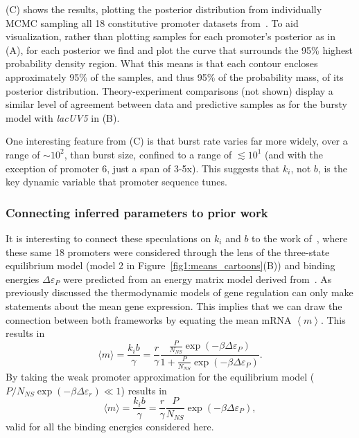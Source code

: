(C) shows the results, plotting the posterior
distribution from individually MCMC sampling all 18 constitutive promoter
datasets from~\cite{Jones2014}. To aid visualization, rather than plotting
samples for each promoter's posterior as in (A), for
each posterior we find and plot the curve that surrounds the 95\% highest
probability density region. What this means is that each contour 
encloses approximately 95\% of the samples, and thus 95\% of the probability
mass, of its posterior distribution. Theory-experiment comparisons (not shown)
display a similar level of agreement between data and predictive samples as for
the bursty model with \textit{lacUV5} in (B).

One interesting feature from (C) is that burst rate
varies far more widely, over a range of $\sim10^2$, than burst size, confined to
a range of $\lesssim10^1$ (and with the exception of promoter 6, just a span of
3-5x). This suggests that $k_i$, not $b$, is the key dynamic variable that
promoter sequence tunes.

\subsubsection{Connecting inferred parameters to prior work}
It is interesting to connect these speculations on $k_i$ and $b$ to the work
of~\cite{Brewster2012}, where these same 18 promoters were considered through
the lens of the three-state equilibrium model (model 2 in
Figure~\ref{fig1:means_cartoons}(B)) and binding energies $\Delta\varepsilon_P$
were predicted from an energy matrix model derived from~\cite{Kinney2010}. As
previously discussed the thermodynamic models of gene regulation can only make
statements about the mean gene expression. This implies that we can draw the
connection between both frameworks by equating the mean mRNA $\left\langle m
\right\rangle$. This results in
\begin{equation}
\langle m \rangle = \frac{k_i b}{\gamma}
        = \frac{r}{\gamma}
        \frac{\frac{P}{N_{NS}}\exp(-\beta\Delta\varepsilon_P)}
                {1+\frac{P}{N_{NS}}\exp(-\beta\Delta\varepsilon_P)}.
\end{equation}
By taking the weak promoter approximation for the equilibrium model ($P/N_{NS} 
\exp(-\beta\Delta\varepsilon_r) \ll 1$) results in
\begin{equation}
\langle m \rangle = \frac{k_i b}{\gamma}
        = \frac{r}{\gamma} \frac{P}{N_{NS}}\exp(-\beta\Delta\varepsilon_P),
\end{equation}
valid for all the binding energies considered here.

